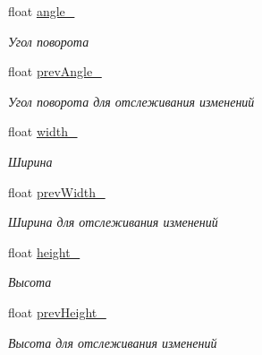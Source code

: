 \begin{DoxyCompactItemize}
\mbox{\label{classrtm_1_1_world_object_aaf64d1d04e4ef1bc481c5f79c99b68ba}} 
float \hyperlink{classrtm_1_1_world_object_aaf64d1d04e4ef1bc481c5f79c99b68ba}{angle\+\_\+}
\begin{DoxyCompactList}\small\item\em Угол поворота \end{DoxyCompactList}\item 
\mbox{\label{classrtm_1_1_world_object_acee095a4e2c8244346f0a7a5208fbd04}} 
float \hyperlink{classrtm_1_1_world_object_acee095a4e2c8244346f0a7a5208fbd04}{prev\+Angle\+\_\+}
\begin{DoxyCompactList}\small\item\em Угол поворота для отслеживания изменений \end{DoxyCompactList}\item 
\mbox{\label{classrtm_1_1_world_object_a80da665dd4334ad3dd8a33c7461b8436}} 
float \hyperlink{classrtm_1_1_world_object_a80da665dd4334ad3dd8a33c7461b8436}{width\+\_\+}
\begin{DoxyCompactList}\small\item\em Ширина \end{DoxyCompactList}\item 
\mbox{\label{classrtm_1_1_world_object_a9dd43ca401792997b814c174da40cec7}} 
float \hyperlink{classrtm_1_1_world_object_a9dd43ca401792997b814c174da40cec7}{prev\+Width\+\_\+}
\begin{DoxyCompactList}\small\item\em Ширина для отслеживания изменений \end{DoxyCompactList}\item 
\mbox{\label{classrtm_1_1_world_object_a0efb406ca0273790ad607e1e87d1ce07}} 
float \hyperlink{classrtm_1_1_world_object_a0efb406ca0273790ad607e1e87d1ce07}{height\+\_\+}
\begin{DoxyCompactList}\small\item\em Высота \end{DoxyCompactList}\item 
\mbox{\label{classrtm_1_1_world_object_a1b08d1adfefde6d956f382418c06c49e}} 
float \hyperlink{classrtm_1_1_world_object_a1b08d1adfefde6d956f382418c06c49e}{prev\+Height\+\_\+}
\begin{DoxyCompactList}\small\item\em Высота для отслеживания изменений \end{DoxyCompactList}\end{DoxyCompactItemize}



